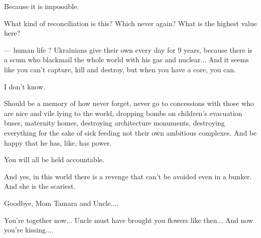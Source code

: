 Because it is impossible.

What kind of reconciliation is this? Which never again? What is the highest
value here?

— human life ? Ukrainians give their own every day for 9 years, because there
is a scum who blackmail the whole world with his gas and nuclear... And it
seems like you can't capture, kill and destroy, but when you have a core, you
can.

I don't know.

Should be a memory of how never forget, never go to concessions with those who
are nice and vile lying to the world, dropping bombs on children's evacuation
buses, maternity homes, destroying architecture monuments, destroying
everything for the sake of sick feeding not their own ambitious complexes. And
be happy that he has, like, has power.

You will all be held accountable.

And yes, in this world there is a revenge that can't be avoided even in a
bunker. And she is the scariest.

Goodbye, Mom Tamara and Uncle....

You're together now... Uncle must have brought you flowers like then... And now
you're kissing....
